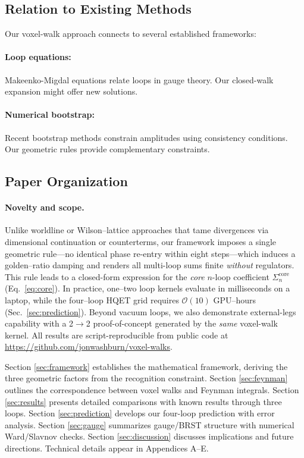 \documentclass[11pt,a4paper]{article}
\theoremstyle{definition}
\theoremstyle{remark}
\begin{document}
\subsection{Relation to Existing Methods}

Our voxel-walk approach connects to several established frameworks:

\paragraph{Loop equations:} Makeenko-Migdal equations \cite{Makeenko1979} relate loops in gauge theory. Our closed-walk expansion might offer new solutions.

\paragraph{Numerical bootstrap:} Recent bootstrap methods \cite{Paulos2016,Gopakumar2017} constrain amplitudes using consistency conditions. Our geometric rules provide complementary constraints.

\subsection{Paper Organization}

\paragraph{Novelty and scope.}
Unlike worldline or Wilson--lattice approaches that tame divergences via dimensional continuation or counterterms, our framework imposes a single geometric rule---no identical phase re-entry within eight steps---which induces a golden--ratio damping and renders all multi-loop sums finite \emph{without} regulators. This rule leads to a closed-form expression for the \emph{core} $n$-loop coefficient $\Sigma_n^{\mathrm{core}}$ (Eq.~\eqref{eq:core}). In practice, one–two loop kernels evaluate in milliseconds on a laptop, while the four–loop HQET grid requires $\mathcal{O}(10)$ GPU–hours (Sec.~\ref{sec:prediction}). Beyond vacuum loops, we also demonstrate external-legs capability with a 2$\to$2 proof-of-concept generated by the \emph{same} voxel-walk kernel. All results are script-reproducible from public code at \url{https://github.com/jonwashburn/voxel-walks}.

Section \ref{sec:framework} establishes the mathematical framework, deriving the three geometric factors from the recognition constraint. Section \ref{sec:feynman} outlines the correspondence between voxel walks and Feynman integrals. Section \ref{sec:results} presents detailed comparisons with known results through three loops. Section \ref{sec:prediction} develops our four-loop prediction with error analysis. Section \ref{sec:gauge} summarizes gauge/BRST structure with numerical Ward/Slavnov checks. Section \ref{sec:discussion} discusses implications and future directions. Technical details appear in Appendices A–E.
\end{document}
